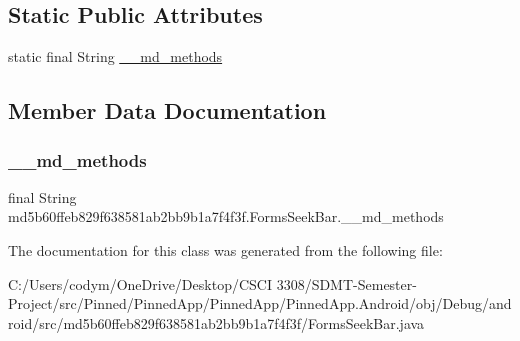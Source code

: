 \subsection*{Static Public Attributes}
\begin{DoxyCompactItemize}
\item 
static final String \hyperlink{classmd5b60ffeb829f638581ab2bb9b1a7f4f3f_1_1_forms_seek_bar_a7c8d57a3b8d9e0664dc0d6410af2b631}{\+\_\+\+\_\+md\+\_\+methods}
\end{DoxyCompactItemize}


\subsection{Member Data Documentation}
\mbox{\label{classmd5b60ffeb829f638581ab2bb9b1a7f4f3f_1_1_forms_seek_bar_a7c8d57a3b8d9e0664dc0d6410af2b631}} 
\subsubsection{\texorpdfstring{\+\_\+\+\_\+md\+\_\+methods}{\_\_md\_methods}}
{\footnotesize\ttfamily final String md5b60ffeb829f638581ab2bb9b1a7f4f3f.\+Forms\+Seek\+Bar.\+\_\+\+\_\+md\+\_\+methods\hspace{0.3cm}{\ttfamily [static]}}



The documentation for this class was generated from the following file\+:\begin{DoxyCompactItemize}
\item 
C\+:/\+Users/codym/\+One\+Drive/\+Desktop/\+C\+S\+C\+I 3308/\+S\+D\+M\+T-\/\+Semester-\/\+Project/src/\+Pinned/\+Pinned\+App/\+Pinned\+App/\+Pinned\+App.\+Android/obj/\+Debug/android/src/md5b60ffeb829f638581ab2bb9b1a7f4f3f/Forms\+Seek\+Bar.\+java\end{DoxyCompactItemize}
